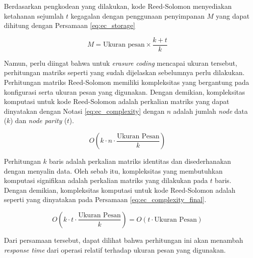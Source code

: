 Berdasarkan pengkodean yang dilakukan, kode Reed-Solomon menyediakan ketahanan sejumlah $t$ kegagalan dengan penggunaan penyimpanan $M$ yang dapat dihitung dengan Persamaan \ref{eq:ec_storage}

\begin{equation}
    M = \text{Ukuran pesan} \times \frac{k + t}{k}
    \label{eq:ec_storage}
\end{equation}

Namun, perlu diingat bahwa untuk \textit{erasure coding} mencapai ukuran tersebut, perhitungan matriks seperti yang sudah dijelaskan sebelumnya perlu dilakukan. Perhitungan matriks Reed-Solomon memiliki kompleksitas yang bergantung pada konfigurasi serta ukuran pesan yang digunakan. Dengan demikian, kompleksitas komputasi untuk kode Reed-Solomon adalah perkalian matriks yang dapat dinyatakan dengan Notasi \ref{eq:ec_complexity} dengan $n$ adalah jumlah \textit{node} data ($k$) dan \textit{node parity} ($t$).

\begin{equation}
    O(k \cdot n \cdot \frac{\text{Ukuran Pesan}}{k})
    \label{eq:ec_complexity}
\end{equation}

Perhitungan $k$ baris adalah perkalian matriks identitas dan disederhanakan dengan menyalin data. Oleh sebab itu, kompleksitas yang membutuhkan komputasi signifikan adalah perkalian matriks yang dilakukan pada $t$ baris. Dengan demikian, kompleksitas komputasi untuk kode Reed-Solomon adalah seperti yang dinyatakan pada Persamaan \ref{eq:ec_complexity_final}.

\begin{equation}
    O(k \cdot t \cdot \frac{\text{Ukuran Pesan}}{k}) = O(t \cdot \text{Ukuran Pesan})
    \label{eq:ec_complexity_final}
\end{equation}

Dari persamaan tersebut, dapat dilihat bahwa perhitungan ini akan menambah \textit{response time} dari operasi relatif terhadap ukuran pesan yang digunakan.
